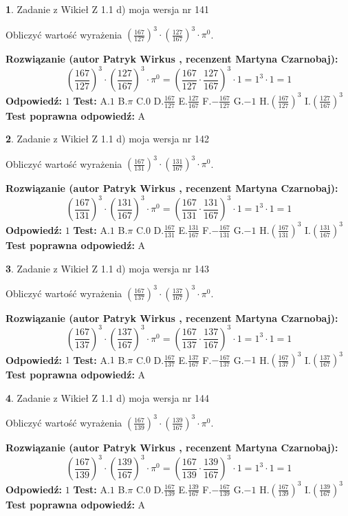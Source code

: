 \documentclass[12pt, a4paper]{article}
\theoremstyle{definition} %
\newtheorem{zad}{}
\newcommand{\zadStart}[1]{\begin{zad}#1\newline}
\newcommand{\zadStop}{\end{zad}}
\newcommand{\rozwStart}[2]{\noindent \textbf{Rozwiązanie (autor #1 , recenzent #2): }\newline}
\newcommand{\rozwStop}{\newline}
\newcommand{\odpStart}{\noindent \textbf{Odpowiedź:}\newline}
\newcommand{\odpStop}{\newline}
\newcommand{\testStart}{\noindent \textbf{Test:}\newline}
\newcommand{\testStop}{\newline}
\newcommand{\kluczStart}{\noindent \textbf{Test poprawna odpowiedź:}\newline}
\newcommand{\kluczStop}{\newline}
\begin{document}
\zadStart{Zadanie z Wikieł Z 1.1 d) moja wersja nr 141}

Obliczyć wartość wyrażenia $(\frac{167}{127})^{3} \cdot (\frac{127}{167})^{3} \cdot \pi^{0}$.
\zadStop
\rozwStart{Patryk Wirkus}{Martyna Czarnobaj}
$$(\frac{167}{127})^{3} \cdot (\frac{127}{167})^{3} \cdot \pi^{0} = (\frac{167}{127} \cdot \frac{127}{167})^{3} \cdot 1 = 1^{3} \cdot 1 = 1$$
\rozwStop
\odpStart
$1$
\odpStop
\testStart
A.$1$ B.$\pi$ C.$0$ D.$\frac{167}{127}$ E.$\frac{127}{167}$
F.$-\frac{167}{127}$ G.$-1$
H.$(\frac{167}{127})^{3}$
I.$(\frac{127}{167})^{3}$
\testStop
\kluczStart
A
\kluczStop



\zadStart{Zadanie z Wikieł Z 1.1 d) moja wersja nr 142}

Obliczyć wartość wyrażenia $(\frac{167}{131})^{3} \cdot (\frac{131}{167})^{3} \cdot \pi^{0}$.
\zadStop
\rozwStart{Patryk Wirkus}{Martyna Czarnobaj}
$$(\frac{167}{131})^{3} \cdot (\frac{131}{167})^{3} \cdot \pi^{0} = (\frac{167}{131} \cdot \frac{131}{167})^{3} \cdot 1 = 1^{3} \cdot 1 = 1$$
\rozwStop
\odpStart
$1$
\odpStop
\testStart
A.$1$ B.$\pi$ C.$0$ D.$\frac{167}{131}$ E.$\frac{131}{167}$
F.$-\frac{167}{131}$ G.$-1$
H.$(\frac{167}{131})^{3}$
I.$(\frac{131}{167})^{3}$
\testStop
\kluczStart
A
\kluczStop



\zadStart{Zadanie z Wikieł Z 1.1 d) moja wersja nr 143}

Obliczyć wartość wyrażenia $(\frac{167}{137})^{3} \cdot (\frac{137}{167})^{3} \cdot \pi^{0}$.
\zadStop
\rozwStart{Patryk Wirkus}{Martyna Czarnobaj}
$$(\frac{167}{137})^{3} \cdot (\frac{137}{167})^{3} \cdot \pi^{0} = (\frac{167}{137} \cdot \frac{137}{167})^{3} \cdot 1 = 1^{3} \cdot 1 = 1$$
\rozwStop
\odpStart
$1$
\odpStop
\testStart
A.$1$ B.$\pi$ C.$0$ D.$\frac{167}{137}$ E.$\frac{137}{167}$
F.$-\frac{167}{137}$ G.$-1$
H.$(\frac{167}{137})^{3}$
I.$(\frac{137}{167})^{3}$
\testStop
\kluczStart
A
\kluczStop



\zadStart{Zadanie z Wikieł Z 1.1 d) moja wersja nr 144}

Obliczyć wartość wyrażenia $(\frac{167}{139})^{3} \cdot (\frac{139}{167})^{3} \cdot \pi^{0}$.
\zadStop
\rozwStart{Patryk Wirkus}{Martyna Czarnobaj}
$$(\frac{167}{139})^{3} \cdot (\frac{139}{167})^{3} \cdot \pi^{0} = (\frac{167}{139} \cdot \frac{139}{167})^{3} \cdot 1 = 1^{3} \cdot 1 = 1$$
\rozwStop
\odpStart
$1$
\odpStop
\testStart
A.$1$ B.$\pi$ C.$0$ D.$\frac{167}{139}$ E.$\frac{139}{167}$
F.$-\frac{167}{139}$ G.$-1$
H.$(\frac{167}{139})^{3}$
I.$(\frac{139}{167})^{3}$
\testStop
\kluczStart
A
\kluczStop
\end{document}
